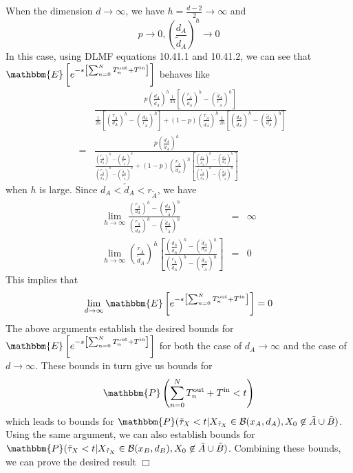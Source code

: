 \documentclass[english, aip, jcp, priprint, graphicx,floatfix]{revtex4-1}
\newcommand{\nin}{\not\in}
\newcommand{\tmop}[1]{\ensuremath{\operatorname{#1}}}
\theoremstyle{plain}
\theoremstyle{definition}
\theoremstyle{plain}
\begin{document}
When the dimension $d \rightarrow \infty$, we have $h = \frac{d - 2}{2}
\rightarrow \infty$ and
\[ p \rightarrow 0, \left( \frac{d_A}{\tilde{d}_A} \right)^h \rightarrow 0 \]
In this case, using DLMF\cite{noauthor_undated-ti} equations 10.41.1 and 10.41.2, we can see that
$\mathbbm{E} \left[ e^{- s \left[ \sum_{n = 0}^N T_n^{\tmop{out}} +
T^{\tmop{in}} \right]} \right]$ behaves like
\begin{eqnarray*}
&  & \frac{p \left( \frac{d_A}{\tilde{d}_A} \right)^h \frac{1}{2 h} \left[
\left( \frac{r_{\tilde{A}}}{\tilde{d}_A} \right)^h - \left(
\frac{\tilde{d}_A}{r_{\tilde{A}}} \right)^h \right]}{\frac{1}{2 h} \left[
\left( \frac{r_{\tilde{A}}}{d_A} \right)^h - \left(
\frac{d_A}{r_{\tilde{A}}} \right)^h \right] + (1 - p) \left(
\frac{r_{\tilde{A}}}{\tilde{d}_A} \right)^h \frac{1}{2 h} \left[ \left(
\frac{d_A}{\tilde{d}_A} \right)^h - \left( \frac{\tilde{d}_A}{d_A} \right)^h
\right]}\\
& = & \frac{p \left( \frac{d_A}{\tilde{d}_A} \right)^h}{\frac{\left(
\frac{r_{\tilde{A}}}{d_A} \right)^h - \left( \frac{d_A}{r_{\tilde{A}}}
\right)^h}{\left( \frac{r_{\tilde{A}}}{\tilde{d}_A} \right)^h - \left(
\frac{\tilde{d}_A}{r_{\tilde{A}}} \right)^h} + (1 - p) \left(
\frac{r_{\tilde{A}}}{\tilde{d}_A} \right)^h \left[ \frac{\left(
\frac{d_A}{\tilde{d}_A} \right)^h - \left( \frac{\tilde{d}_A}{d_A}
\right)^h}{\left( \frac{r_{\tilde{A}}}{\tilde{d}_A} \right)^h - \left(
\frac{\tilde{d}_A}{r_{\tilde{A}}} \right)^h} \right]}
\end{eqnarray*}
when $h$ is large. Since $d_A < \tilde{d}_A < r_{\tilde{A}}$, we have
\begin{eqnarray*}
\lim_{h \rightarrow \infty} \frac{\left( \frac{r_{\tilde{A}}}{d_A} \right)^h
- \left( \frac{d_A}{r_{\tilde{A}}} \right)^h}{\left(
\frac{r_{\tilde{A}}}{\tilde{d}_A} \right)^h - \left(
\frac{\tilde{d}_A}{r_{\tilde{A}}} \right)^h} & = & \infty\\
\lim_{h \rightarrow \infty} \left( \frac{r_{\tilde{A}}}{\tilde{d}_A}
\right)^h \left[ \frac{\left( \frac{d_A}{\tilde{d}_A} \right)^h - \left(
\frac{\tilde{d}_A}{d_A} \right)^h}{\left( \frac{r_{\tilde{A}}}{\tilde{d}_A}
\right)^h - \left( \frac{\tilde{d}_A}{r_{\tilde{A}}} \right)^h} \right] & =
& 0
\end{eqnarray*}
This implies that
\[ \lim_{d \rightarrow \infty} \mathbbm{E} \left[ e^{- s \left[ \sum_{n = 0}^N
T_n^{\tmop{out}} + T^{\tmop{in}} \right]} \right] = 0 \]
The above arguments establish the desired bounds for $\mathbbm{E} \left[ e^{-
s \left[ \sum_{n = 0}^N T_n^{\tmop{out}} + T^{\tmop{in}} \right]} \right]$ for
both the case of $d_A \rightarrow \infty$ and the case of $d \rightarrow
\infty$. These bounds in turn give us bounds for
\[ \mathbbm{P} \left( \sum_{n = 0}^N T_n^{\tmop{out}} + T^{\tmop{in}} < t
\right) \]
which leads to bounds for $ \mathbbm{P} (\tilde{\tau}_X < t|X_{\tilde{\tau}_X} \in \mathcal{B} (x_A, d_A), X_0 \nin \tilde{A} \cup \tilde{B}) $. 
Using the same argument, we can also establish bounds for
$ \mathbbm{P} (\tilde{\tau}_X < t|X_{\tilde{\tau}_X} \in \mathcal{B} (x_B,
d_B), X_0 \nin \tilde{A} \cup \tilde{B})$. 
Combining these bounds, we can prove the desired result
\hspace*{\fill}$\Box$\medskip
\end{document}
